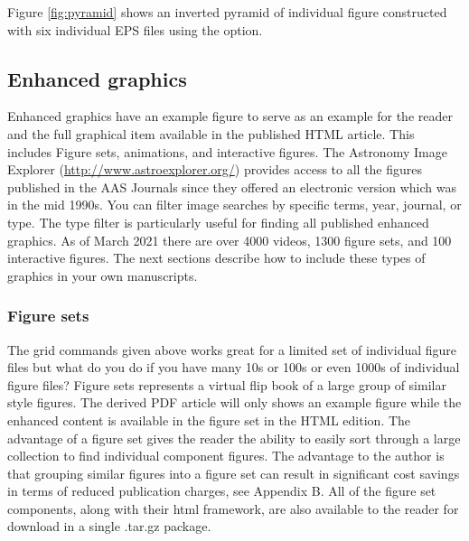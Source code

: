 \documentclass[linenumbers]{aastex631}
\begin{document}
Figure \ref{fig:pyramid} shows an inverted pyramid of individual
figure constructed with six individual EPS files using the
{\tt\string\gridline} option.

\begin{figure*}
\caption{Inverted pyramid figure of six individual files. The nova are
(a) V2491 Cyg, (b) HV Cet, (c) LMC 2009, (d) RS Oph, (e) U Sco, and (f) 
KT Eri. These individual figures are taken from \citet{2011ApJS..197...31S}.
\label{fig:pyramid}}
\end{figure*}

\subsection{Enhanced graphics}

Enhanced graphics have an example figure to serve as an example for the
reader and the full graphical item available in the published HTML article.
This includes Figure sets, animations, and interactive figures. The 
Astronomy Image Explorer (\url{http://www.astroexplorer.org/}) provides 
access to all the figures published in the AAS Journals since they offered
an electronic version which was in the mid 1990s. You can filter image
searches by specific terms, year, journal, or type. The type filter is 
particularly useful for finding all published enhanced graphics. As of
March 2021 there are over 4000 videos, 1300 figure sets, and 100 interactive
figures. The next sections describe how to include these types of graphics
in your own manuscripts.

\subsubsection{Figure sets}

The grid commands given above works great for a limited set of individual
figure files but what do you do if you have many 10s or 100s or even 1000s of
individual figure files? Figure sets represents a virtual flip book of a
large group of similar style figures.  The derived PDF article will only
shows an example figure while the enhanced content is available in the
figure set in the HTML edition.  The advantage of a figure set gives the
reader the ability to easily sort through a large collection to find
individual component figures.  The advantage to the author is that grouping
similar figures into a figure set can result in significant cost savings in
terms of reduced publication charges, see Appendix B. All of the figure set
components, along with their html framework, are also available to the reader
for download in a single .tar.gz package.
\end{document}
